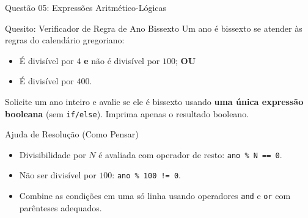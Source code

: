 \begin{frame}{Questão 05: Expressões Aritmético-Lógicas}
    \begin{block}{Quesito: Verificador de Regra de Ano Bissexto}
        Um ano é bissexto se atender às regras do calendário gregoriano:
        \begin{itemize}
            \item É divisível por $4$ \textbf{e} não é divisível por $100$; \textbf{OU}
            \item É divisível por $400$.
        \end{itemize}
        Solicite um ano inteiro e avalie se ele é bissexto usando \textbf{uma única expressão booleana} (sem \texttt{if/else}). Imprima apenas o resultado booleano.
    \end{block}

    \begin{exampleblock}{Ajuda de Resolução (Como Pensar)}
        \begin{itemize}
            \item Divisibilidade por $N$ é avaliada com operador de resto: \texttt{ano \% N == 0}.
            \item Não ser divisível por $100$: \texttt{ano \% 100 != 0}.
            \item Combine as condições em uma só linha usando operadores \texttt{and} e \texttt{or} com parênteses adequados.
        \end{itemize}
    \end{exampleblock}
\end{frame}

